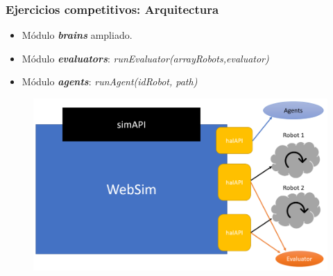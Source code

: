 \documentclass[xcolor={table}]{beamer}
\begin{document}
		\begin{frame}
			\frametitle{\LARGE{Ejercicios competitivos: Arquitectura}}
			\begin{itemize}
			    \item \large{Módulo \textit{\textbf{brains}} ampliado.}
			    \item \large{Módulo \textit{\textbf{evaluators}}:} \normalsize{\textit{runEvaluator(arrayRobots,evaluator)}}
	
			    \item \large{Módulo \textit{\textbf{agents}}:} \normalsize{\textit{runAgent(idRobot, path)} }
			   
			\end{itemize}
			\begin{figure}
			    \centering			    \includegraphics[scale=0.4]{img/arquitectura.png}
			\end{figure}
		\end{frame}
		
\end{document}

